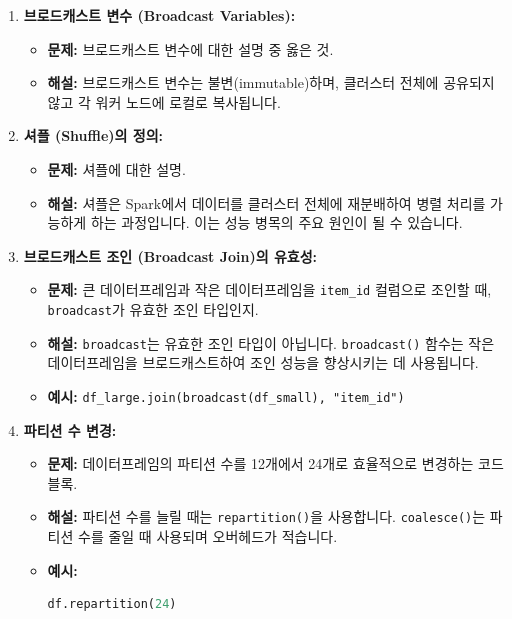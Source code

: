 \documentclass[11pt,a4paper]{article}
\theoremstyle{definition}
\begin{document}
\begin{enumerate}
    \item \textbf{브로드캐스트 변수 (Broadcast Variables):}
    \begin{itemize}
        \item \textbf{문제:} 브로드캐스트 변수에 대한 설명 중 옳은 것.
        \item \textbf{해설:} 브로드캐스트 변수는 불변(immutable)하며, 클러스터 전체에 공유되지 않고 각 워커 노드에 로컬로 복사됩니다.
    \end{itemize}

    \item \textbf{셔플 (Shuffle)의 정의:}
    \begin{itemize}
        \item \textbf{문제:} 셔플에 대한 설명.
        \item \textbf{해설:} 셔플은 Spark에서 데이터를 클러스터 전체에 재분배하여 병렬 처리를 가능하게 하는 과정입니다. 이는 성능 병목의 주요 원인이 될 수 있습니다.
    \end{itemize}

    \item \textbf{브로드캐스트 조인 (Broadcast Join)의 유효성:}
    \begin{itemize}
        \item \textbf{문제:} 큰 데이터프레임과 작은 데이터프레임을 \texttt{item_id} 컬럼으로 조인할 때, \texttt{broadcast}가 유효한 조인 타입인지.
        \item \textbf{해설:} \texttt{broadcast}는 유효한 조인 타입이 아닙니다. \texttt{broadcast()} 함수는 작은 데이터프레임을 브로드캐스트하여 조인 성능을 향상시키는 데 사용됩니다.
        \item \textbf{예시:} \texttt{df_large.join(broadcast(df_small), "item_id")}
    \end{itemize}

    \item \textbf{파티션 수 변경:}
    \begin{itemize}
        \item \textbf{문제:} 데이터프레임의 파티션 수를 12개에서 24개로 효율적으로 변경하는 코드 블록.
        \item \textbf{해설:} 파티션 수를 늘릴 때는 \texttt{repartition()}을 사용합니다. \texttt{coalesce()}는 파티션 수를 줄일 때 사용되며 오버헤드가 적습니다.
        \item \textbf{예시:}
        \begin{lstlisting}[language=Python, caption=repartition 예시]
df.repartition(24)
        \end{lstlisting}
    \end{itemize}


\end{enumerate}
\end{document}
